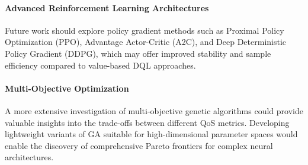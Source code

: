 \documentclass{svproc}
\begin{document}
\paragraph{Advanced Reinforcement Learning Architectures}
Future work should explore policy gradient methods such as Proximal Policy Optimization (PPO), Advantage Actor-Critic (A2C), and Deep Deterministic Policy Gradient (DDPG), which may offer improved stability and sample efficiency compared to value-based DQL approaches.


\paragraph{Multi-Objective Optimization}
A more extensive investigation of multi-objective genetic algorithms could provide valuable insights into the trade-offs between different QoS metrics. Developing lightweight variants of GA suitable for high-dimensional parameter spaces would enable the discovery of comprehensive Pareto frontiers for complex neural architectures.

%
%
\end{document}
